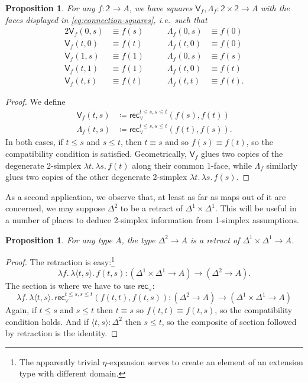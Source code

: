 \documentclass{amsart}
\theoremstyle{plain}
\newtheorem{prop}[thm]{Proposition}
\theoremstyle{definition}
\theoremstyle{remark}
\numberwithin{equation}{section}
\newcommand{\jdeq}{\equiv}
\newcommand{\defeq}{\coloneqq}
\newcommand{\pair}[1]{\langle #1\rangle}
\newcommand{\rec}{\mathsf{rec}}
\newcommand{\connmax}[1]{\mathsf{V}_{#1}}
\newcommand{\connmin}[1]{\mathsf{\Lambda}_{#1}}
\newcommand{\lam}[1]{\lambda #1.\,}
\newcommand{\two}{\mathbb{2}}
\begin{document}
\begin{prop}\label{prop:connections}
  For any $f:\two\to A$, we have squares $\connmax f,\connmin f:\two\times\two\to A$ with the faces displayed in \eqref{eq:connection-squares}, i.e.\ such that
  \begin{alignat*}{2}
    \connmax f(0,s) &\jdeq f(s) &\qquad \connmin f(0,s) &\jdeq f(0)\\
    \connmax f(t,0) &\jdeq f(t) &\qquad \connmin f(t,0) &\jdeq f(0)\\
    \connmax f(1,s) &\jdeq f(1) &\qquad \connmin f(0,s) &\jdeq f(s)\\
    \connmax f(t,1) &\jdeq f(1) &\qquad \connmin f(t,0) &\jdeq f(t)\\
    \connmax f(t,t) &\jdeq f(t) &\qquad \connmin f(t,t) &\jdeq f(t).
  \end{alignat*}
\end{prop}
\begin{proof}
  We define
  \begin{align*}
    \connmax f(t,s) &\defeq \rec_\lor^{t\le s, s\le t}(f(s),f(t))\\
    \connmin f(t,s) &\defeq \rec_\lor^{t\le s, s\le t}(f(t),f(s)).
  \end{align*}
  In both cases, if $t\le s$ and $s\le t$, then $t\jdeq s$ and so $f(s)\jdeq f(t)$, so the compatibility condition is satisfied.
  Geometrically, $\connmax f$ glues two copies of the degenerate 2-simplex $\lam{t}\lam{s} f(t)$ along their common 1-face, while $\connmin f$ similarly glues two copies of the other degenerate 2-simplex $\lam{t}\lam{s} f(s)$.
\end{proof}

As a second application, we observe that, at least as far as maps out of it are concerned, we may suppose $\Delta^2$ to be a retract of $\Delta^1\times\Delta^1$.
This will be useful in a number of places to deduce 2-simplex information from 1-simplex assumptions.

\begin{prop}\label{prop:two-simp-as-retract}
  For any type $A$, the type $\Delta^2\to A$ is a retract of $\Delta^1\times\Delta^1\to A$.
\end{prop}
\begin{proof}
  The retraction is easy:\footnote{The apparently trivial $\eta$-expansion serves to create an element of an extension type with different domain.}
  \[ \lam{f} \lam{\pair{t,s}} f(t,s) : (\Delta^1\times\Delta^1\to A) \to (\Delta^2\to A). \]
  The section is where we have to use $\rec_\lor$:
  \[ \lam{f} \lam{\pair{t,s}} \rec_{\lor}^{t\le s,s\le t}(f(t,t),f(t,s)) : (\Delta^2\to A)\to (\Delta^1\times\Delta^1\to A) \]
  Again, if $t\le s$ and $s\le t$ then $t\jdeq s$ so $f(t,t)\jdeq f(t,s)$, so the compatibility condition holds.
  And if $\pair{t,s}:\Delta^2$ then $s\le t$, so the composite of section followed by retraction is the identity.
\end{proof}
\end{document}
